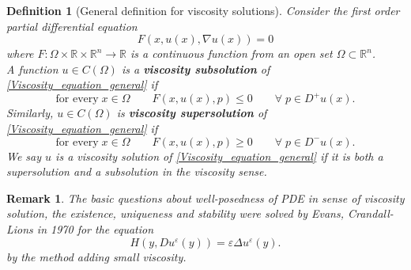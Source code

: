 \documentclass[12pt, oneside]{amsart}  	%
\newtheorem{definition}{Definition}
\newtheorem{remark}{Remark}
\begin{document}
\begin{definition}[General definition for viscosity solutions] Consider the first order partial differential equation
\begin{equation}\label{Viscosity_equation_general}
F(x,u(x),\nabla u(x)) = 0
\end{equation}
where $F:\Omega \times \mathbb{R}\times \mathbb{R}^n\longrightarrow \mathbb{R}$ is a continuous function from an open set $\Omega\subset \mathbb{R}^n$.\\
A function $u\in C(\Omega)$ is a \textbf{viscosity subsolution} of \eqref{Viscosity_equation_general} if
\begin{equation*}
\text{for every}\;x\in \Omega\qquad F(x,u(x),p) \leq 0 \qquad\forall\; p\in D^+u(x).
\end{equation*}
Similarly, $u\in C(\Omega)$ is \textbf{viscosity supersolution} of \eqref{Viscosity_equation_general} if
\begin{equation*}
\text{for every}\;x\in \Omega\qquad F(x,u(x),p) \geq 0 \qquad\forall\; p\in D^-u(x).
\end{equation*}
We say $u$ is a viscosity solution of \eqref{Viscosity_equation_general} if it is both a supersolution and a subsolution in the viscosity sense.
\end{definition}

\begin{remark}
The basic questions about well-posedness of PDE in sense of viscosity solution, the existence, uniqueness and stability were solved by Evans, Crandall-Lions in 1970 for the equation
\begin{equation*}
H(y,Du^\varepsilon(y)) = \varepsilon \Delta u^\varepsilon(y).
\end{equation*}
by the method adding small viscosity.
\end{remark}
\end{document}

